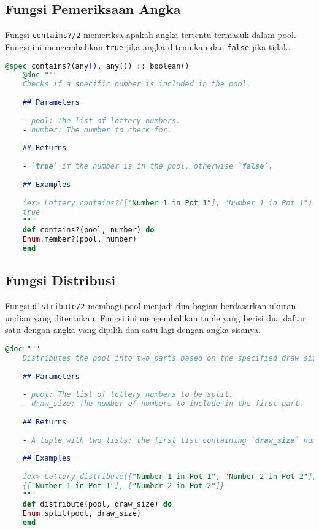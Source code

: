 \subsection{Fungsi Pemeriksaan Angka}

Fungsi \texttt{contains?/2} memeriksa apakah angka tertentu termasuk dalam pool. Fungsi ini mengembalikan \texttt{true} jika angka ditemukan dan \texttt{false} jika tidak.

\begin{lstlisting}[language=elixir, caption={Fungsi Pemeriksaan Angka}]
	@spec contains?(any(), any()) :: boolean()
	@doc """
	Checks if a specific number is included in the pool.
	
	## Parameters
	
	- pool: The list of lottery numbers.
	- number: The number to check for.
	
	## Returns
	
	- `true` if the number is in the pool, otherwise `false`.
	
	## Examples
	
	iex> Lottery.contains?(["Number 1 in Pot 1"], "Number 1 in Pot 1")
	true
	"""
	def contains?(pool, number) do
	Enum.member?(pool, number)
	end
\end{lstlisting}

\subsection{Fungsi Distribusi}

Fungsi \texttt{distribute/2} membagi pool menjadi dua bagian berdasarkan ukuran undian yang ditentukan. Fungsi ini mengembalikan tuple yang berisi dua daftar: satu dengan angka yang dipilih dan satu lagi dengan angka sisanya.

\begin{lstlisting}[language=elixir, caption={Fungsi Distribusi}]
	@doc """
	Distributes the pool into two parts based on the specified draw size.
	
	## Parameters
	
	- pool: The list of lottery numbers to be split.
	- draw_size: The number of numbers to include in the first part.
	
	## Returns
	
	- A tuple with two lists: the first list containing `draw_size` numbers, and the second list containing the remaining numbers.
	
	## Examples
	
	iex> Lottery.distribute(["Number 1 in Pot 1", "Number 2 in Pot 2"], 1)
	{["Number 1 in Pot 1"], ["Number 2 in Pot 2"]}
	"""
	def distribute(pool, draw_size) do
	Enum.split(pool, draw_size)
	end
\end{lstlisting}



